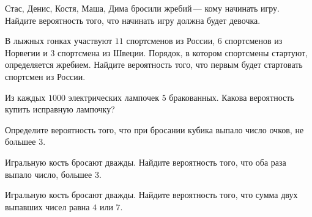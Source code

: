 \begin{class}[number=3]
\begin{listofex}
		\item Стас, Денис, Костя, Маша, Дима бросили жребий --- кому начинать игру. Найдите вероятность того, что начинать игру должна будет девочка.
		\item В лыжных гонках участвуют \( 11 \) спортсменов из России, \( 6 \) спортсменов из Норвегии и \( 3 \) спортсмена из Швеции. Порядок, в котором спортсмены стартуют, определяется жребием. Найдите вероятность того, что первым будет стартовать спортсмен из России.
		\item Из каждых \( 1000 \) электрических лампочек \( 5 \) бракованных. Какова вероятность купить исправную лампочку?
		\item Определите вероятность того, что при бросании кубика выпало число очков, не большее \( 3 \).
		\item Игральную кость бросают дважды. Найдите вероятность того, что оба раза выпало число, большее \( 3 \).
		\item Игральную кость бросают дважды. Найдите вероятность того, что сумма двух выпавших чисел равна \( 4 \) или \( 7 \).
	\end{listofex}
\end{class}

